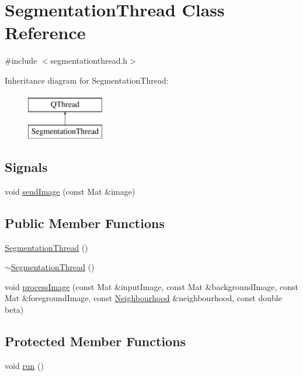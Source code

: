 \hypertarget{classSegmentationThread}{\section{Segmentation\-Thread Class Reference}
\label{classSegmentationThread}
}


{\ttfamily \#include $<$segmentationthread.\-h$>$}

Inheritance diagram for Segmentation\-Thread\-:\begin{figure}[H]
\begin{center}
\leavevmode
\includegraphics[height=2.000000cm]{classSegmentationThread}
\end{center}
\end{figure}
\subsection*{Signals}
\begin{DoxyCompactItemize}
\item 
void \hyperlink{classSegmentationThread_a2e74f10ff17d3f8d1c8d0767b6ff5e5e}{send\-Image} (const Mat \&image)
\end{DoxyCompactItemize}
\subsection*{Public Member Functions}
\begin{DoxyCompactItemize}
\item 
\hyperlink{classSegmentationThread_a5c5b9a1f21e114db574804220a7c2c21}{Segmentation\-Thread} ()
\item 
\hyperlink{classSegmentationThread_a3f8e826a615355c7ee2abb76601d2deb}{$\sim$\-Segmentation\-Thread} ()
\item 
void \hyperlink{classSegmentationThread_af901597e735165b6ef3b894826779eff}{process\-Image} (const Mat \&input\-Image, const Mat \&background\-Image, const Mat \&foreground\-Image, const \hyperlink{classNeighbourhood}{Neighbourhood} \&neighbourhood, const double beta)
\end{DoxyCompactItemize}
\subsection*{Protected Member Functions}
\begin{DoxyCompactItemize}
\item 
void \hyperlink{classSegmentationThread_ad98d9532eb60741d884849f26f62c38c}{run} ()
\end{DoxyCompactItemize}


